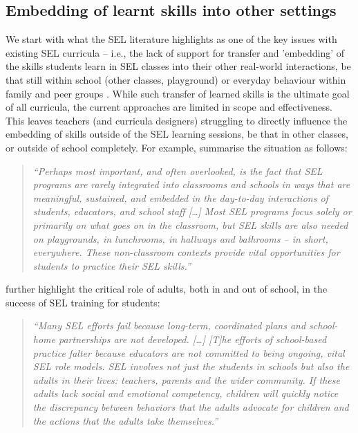 \documentclass[prodmode,acmtochi]{acmsmall}
\newcommand{\qqq}[1]{\begin{quotation} \emph{``#1''} \end{quotation}}
\begin{document}
\subsection{Embedding of learnt skills into other settings}
\label{sec:embedding}
We start with what the SEL literature highlights as one of the key issues with existing SEL curricula -- i.e., the lack of support for transfer and 'embedding' of the skills students learn in SEL classes into their other real-world interactions, be that still within school (other classes, playground) or everyday behaviour within family and peer groups \cite{Maree2007,jones2012social,Patrikakou2005,Elias1997}. 
%
While such transfer of learned skills is the ultimate goal of all curricula, the current approaches are limited in scope and effectiveness. This leaves teachers (and curricula designers) struggling to directly influence the embedding of skills outside of the SEL learning sessions, be that in other classes, or outside of school completely.
%
For example,  summarise the situation as follows: \qqq{Perhaps most important, and often overlooked, is the fact that SEL programs are rarely integrated into classrooms and schools in ways that are meaningful, sustained, and embedded in the day-to-day interactions of students, educators, and school staff [\dots] Most SEL programs focus solely or primarily on what goes on in the classroom, but SEL skills are also needed on playgrounds, in lunchrooms, in hallways and bathrooms -- in short, everywhere. These non-classroom contexts provide vital opportunities for students to practice their SEL skills.}
%
 further highlight the critical role of adults, both in and out of school, in the success of SEL training for students: \qqq{Many SEL efforts fail because long-term, coordinated plans and school-home partnerships are not developed. [\dots] [T]he efforts of school-based practice falter because educators are not committed to being ongoing, vital SEL role models. SEL involves not just the students in schools but also the adults in their lives: teachers, parents and the wider community. If these adults lack social and emotional competency, children will quickly notice the discrepancy between behaviors that the adults advocate for children and the actions that the adults take themselves.}


\end{document}
